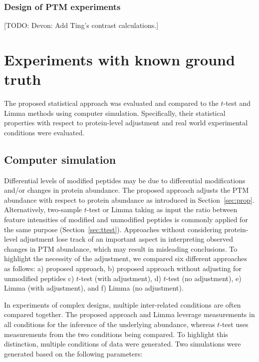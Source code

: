 \documentclass{mcp}
\def\todo#1{{\color{red}[TODO: #1]}}
\def\secref#1{Section~\ref{#1}}
\begin{document}

\subsubsection{Design of PTM experiments}

\todo{Devon: Add Ting's contrast calculations.}

\clearpage
\section{Experiments with known ground truth}
\label{sec:sim}

The proposed statistical approach was evaluated and compared to the $t$-test and Limma methods using computer simulation. Specifically, their statistical properties with respect to protein-level adjustment and real world experimental conditions were evaluated.


\subsection{Computer simulation}

Differential levels of modified peptides may be due to differential modifications and/or changes in protein abundance. The proposed approach adjusts the PTM abundance with respect to protein abundance as introduced in \secref{sec:prop}. Alternatively, two-sample $t$-test or Limma taking as input the ratio between feature intensities of modified and unmodified peptides is commonly applied for the same purpose (\secref{sec:ttest}). 
Approaches without considering protein-level adjustment lose track of an important aspect in interpreting observed changes in PTM abundance, which may result in misleading conclusions. To highlight the necessity of the adjustment, we compared six different approaches as follows: a) proposed approach, b) proposed approach without adjusting for unmodified peptides c) $t$-test (with adjustment), d) $t$-test (no adjustment), e) Limma (with adjustment), and f) Limma (no adjustment).

In experiments of complex designs, multiple inter-related conditions are often compared together. The proposed approach and Limma leverage measurements in all conditions for the inference of the underlying abundance, whereas $t$-test uses measurements from the two conditions being compared. To highlight this distinction, multiple conditions of data were generated. Two simulations were generated based on the following parameters: 
\end{document}
